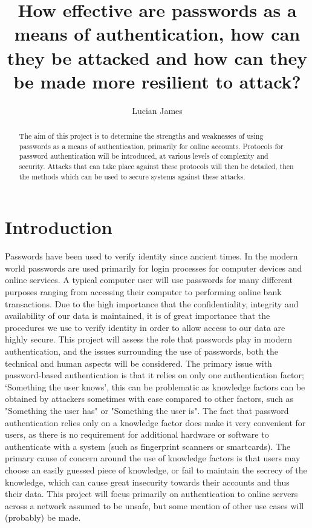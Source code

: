 \documentclass[11pt]{article}
\title{How effective are passwords as a means of authentication, how can they be attacked and how can they be made more resilient to attack?}
\author{Lucian James}
\let\oldcite=\cite
\renewcommand\cite[1]{\ifthenelse{\equal{#1}{NEEDED}}{[citation~needed]}{\oldcite{#1}}}
\begin{document}
\maketitle
\begin{abstract}
The aim of this project is to determine the strengths and weaknesses of using passwords as a means of authentication, primarily for online accounts.
Protocols for password authentication will be introduced, at various levels of complexity and security.
Attacks that can take place against these protocols will then be detailed, then the methods which can be used to secure systems against these attacks.
\end{abstract}

\section{Introduction} \label{INTRO}
Passwords have been used to verify identity since ancient times\cite{NEEDED}.
In the modern world passwords are used primarily for login processes for computer devices and online services. 
A typical computer user will use passwords for many different purposes ranging from accessing their computer to performing online bank transactions.
Due to the high importance that the confidentiality, integrity and availability of our data is maintained, it is of great importance that the procedures we use to verify identity in order to allow access to our data are highly secure.
This project will assess the role that passwords play in modern authentication, and the issues surrounding the use of passwords, both the technical and human aspects will be considered.
The primary issue with password-based authentication is that it relies on only one authentication factor; `Something the user knows', this can be problematic as knowledge factors can be obtained by attackers sometimes with ease compared to other factors, such as "Something the user has" or "Something the user is".
The fact that password authentication relies only on a knowledge factor does make it very convenient for users, as there is no requirement for additional hardware or software to authenticate with a system (such as fingerprint scanners or smartcards).
The primary cause of concern around the use of knowledge factors is that users may choose an easily guessed piece of knowledge, or fail to maintain the secrecy of the knowledge, which can cause great insecurity towards their accounts and thus their data.
This project will focus primarily on authentication to online servers across a network assumed to be unsafe, but some mention of other use cases will (probably) be made.\\
\end{document}
